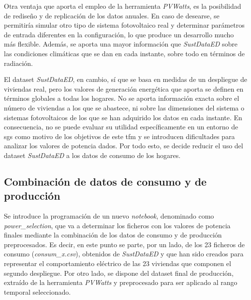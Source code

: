 \vspace{3mm}

Otra ventaja que aporta el empleo de la herramienta \textit{PVWatts}, es la posibilidad de rediseño y de replicación de los datos anuales. En caso de desearse, se permitiría simular otro tipo de sistema fotovoltaico real y determinar parámetros de entrada diferentes en la configuración, lo que produce un desarrollo mucho más flexible. Además, se aporta una mayor información que \textit{SustDataED} sobre las condiciones climáticas que se dan en cada instante, sobre todo en términos de radiación.

\vspace{3mm}

El dataset \textit{SustDataED}, en cambio, sí que se basa en medidas de un despliegue de viviendas real, pero los valores de generación energética que aporta se definen en términos globales a todas los hogares. No se aporta información exacta sobre el número de viviendas a los que se abastece, ni sobre las dimensiones del sistema o sistemas fotovoltaicos de los que se han adquirido los datos en cada instante. En consecuencia, no se puede evaluar su utilidad específicamente en un entorno de \gls{sg}s como motivo de los objetivos de este \gls{tfm} y se introducen dificultades para analizar los valores de potencia dados. Por todo esto, se decide reducir el uso del dataset \textit{SustDataED} a los datos de consumo de los hogares.

\subsection{Combinación de datos de consumo y de producción}
\label{sec:combinacion}

Se introduce la programación de un nuevo \textit{notebook}, denominado como \textit{power\_selection}, que va a determinar los ficheros con los valores de potencia finales mediante la combinación de los datos de consumo y de producción preprocesados. Es decir, en este punto se parte, por un lado, de los 23 ficheros de consumo (\textit{consum\_x.csv}), obtenidos de \textit{SustDataED} y que han sido creados para representar el comportamiento eléctrico de las 23 viviendas que componen el segundo despliegue. Por otro lado, se dispone del dataset final de producción, extraído de la herramienta \textit{PVWatts} y preprocesado para ser aplicado al rango temporal seleccionado. 

\vspace{3mm}


